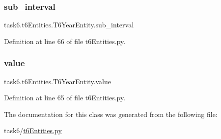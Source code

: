 \subsubsection{\texorpdfstring{sub\+\_\+interval}{sub\_interval}}
{\footnotesize\ttfamily task6.\+t6\+Entities.\+T6\+Year\+Entity.\+sub\+\_\+interval}



Definition at line 66 of file t6\+Entities.\+py.

\mbox{\label{classtask6_1_1t6Entities_1_1T6YearEntity_a5ac04f619f697c6e554af341bd3b379c}} 
\subsubsection{\texorpdfstring{value}{value}}
{\footnotesize\ttfamily task6.\+t6\+Entities.\+T6\+Year\+Entity.\+value}



Definition at line 65 of file t6\+Entities.\+py.



The documentation for this class was generated from the following file\+:\begin{DoxyCompactItemize}
\item 
task6/\hyperlink{t6Entities_8py}{t6\+Entities.\+py}\end{DoxyCompactItemize}
